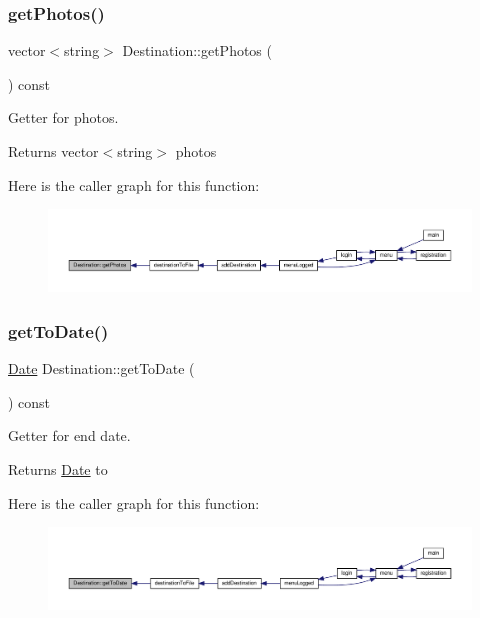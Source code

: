\subsubsection{\texorpdfstring{get\+Photos()}{getPhotos()}}
{\footnotesize\ttfamily vector$<$string$>$ Destination\+::get\+Photos (\begin{DoxyParamCaption}{ }\end{DoxyParamCaption}) const\hspace{0.3cm}{\ttfamily [inline]}}

Getter for photos. \begin{DoxyReturn}{Returns}
vector$<$string$>$ photos 
\end{DoxyReturn}
Here is the caller graph for this function\+:\nopagebreak
\begin{figure}[H]
\begin{center}
\leavevmode
\includegraphics[width=350pt]{class_destination_ade746815624a6fd5add31a3475e04b45_icgraph}
\end{center}
\end{figure}
\mbox{\label{class_destination_a6a98c7e1c0ffa4b821d3f7dd85cad3dd}} 
\subsubsection{\texorpdfstring{get\+To\+Date()}{getToDate()}}
{\footnotesize\ttfamily \hyperlink{class_date}{Date} Destination\+::get\+To\+Date (\begin{DoxyParamCaption}{ }\end{DoxyParamCaption}) const\hspace{0.3cm}{\ttfamily [inline]}}

Getter for end date. \begin{DoxyReturn}{Returns}
\hyperlink{class_date}{Date} to 
\end{DoxyReturn}
Here is the caller graph for this function\+:\nopagebreak
\begin{figure}[H]
\begin{center}
\leavevmode
\includegraphics[width=350pt]{class_destination_a6a98c7e1c0ffa4b821d3f7dd85cad3dd_icgraph}
\end{center}
\end{figure}
\mbox{\label{class_destination_a08199ade6e0bf7488d796d85dec8cfd9}} 
